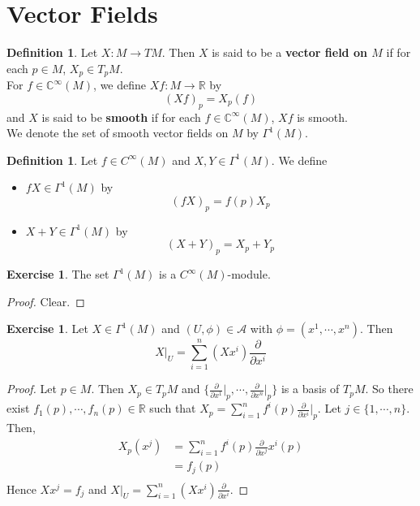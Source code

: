 \documentclass{book}
\theoremstyle{definition}
\newtheorem{defn}[definition]{Definition}
\newtheorem{ex}[definition]{Exercise}
\newcommand{\Gam}{\Gamma}
\newcommand{\C}{\mathbb{C}}
\newcommand{\R}{\mathbb{R}}
\newcommand{\MA}{\mathcal{A}}
\DeclareMathOperator*{\0}{\mbf{0}}
\DeclareMathOperator*{\1}{\mbf{1}}
\newcommand{\p}{\partial}
\begin{document}
	
	
	
	
	
	
	
	
	
	
	
	
	
	\newpage	
	\section{Vector Fields}
	
	\begin{defn}
		Let $X: M \rightarrow TM$. Then $X$ is said to be a \textbf{vector field on $M$} if for each $p \in M$, $X_p \in T_p M$. \\
		For $f \in \C^{\infty}(M)$, we define $Xf : M \rightarrow \R$ by $$(Xf)_p = X_p(f)$$ 
		and $X$ is said to be \textbf{smooth} if for each $f \in \C^{\infty}(M)$, $Xf$ is smooth.\\
		We denote the set of smooth vector fields on $M$ by $\Gam^1(M)$.
	\end{defn}

	\begin{defn}
	Let $f \in C^{\infty}(M)$ and $X,Y \in \Gam^1(M)$. We define 
	\begin{itemize}
	\item $fX \in \Gam^1(M)$ by $$(fX)_p = f(p)X_p$$
	\item $X+Y \in \Gam^1(M)$ by $$(X+Y)_p = X_p+Y_p$$
	\end{itemize}
	\end{defn}
	
	\begin{ex}
	The set $\Gam^1(M)$ is a $C^{\infty}(M)$-module.
	\end{ex}
	
	\begin{proof}
	Clear.
	\end{proof}

	\begin{ex}
		Let $X \in \Gam^1(M)$ and $(U, \phi) \in \MA$ with $\phi = (x^1, \cdots, x^n)$. Then $$X|_U = \sum_{i=1}^n (Xx^i)\frac{\p}{\p x^i}$$ 
	\end{ex}

	\begin{proof}
		Let $p \in M$. Then $X_p \in T_pM$ and $\bigg \{ \frac{\p}{\p x^1} \bigg|_p, \cdots, \frac{\p}{\p x^n} \bigg|_p \bigg \}$ is a basis of $T_pM$. So there exist $f_1(p), \cdots, f_n(p) \in \R$ such that $X_p = \sum\limits_{i=1}^n f^i(p) \frac{\p}{\p x^i} \bigg |_p $. Let $j \in \{1, \cdots, n\}$. Then,
		\begin{align*}
			X_p(x^j) 
			&= \sum\limits_{i=1}^n f^i(p) {\frac{\p}{\p x^j}{x^i}}(p) \\
			&= f_j(p) \\
		\end{align*} 
		Hence $Xx^j = f_j$ and $X|_U = \sum\limits_{i=1}^n (Xx^i)\frac{\p}{\p x^i}$.
	\end{proof}
	
\end{document}
